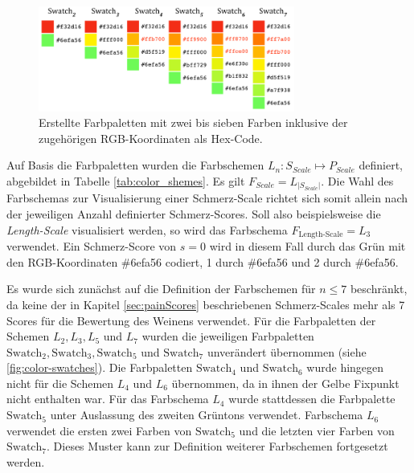 \begin{figure}[h]
	\centering
	\includegraphics[width=0.75\textwidth]{bilder/colorpics.png}
	\caption[Erstellte Farbpaletten mit zwei bis sieben Farben ]{Erstellte Farbpaletten mit zwei bis sieben Farben inklusive der zugehörigen RGB-Koordinaten als Hex-Code.}
	\label{fig:color-swatches}
\end{figure}

Auf Basis die Farbpaletten wurden die Farbschemen $L_{n}: S_{Scale} \mapsto P_{Scale}$ definiert, abgebildet in Tabelle \ref{tab:color_shemes}. Es gilt $F_{Scale} = L_{|S_{Scale}|}$. Die Wahl des Farbschemas zur Visualisierung einer Schmerz-Scale richtet sich somit allein nach der jeweiligen Anzahl definierter Schmerz-Scores. Soll also beispielsweise die \emph{Length-Scale} visualisiert werden, so wird das Farbschema $F_{\text{Length-Scale}} = L_3$ verwendet. Ein Schmerz-Score von $s = 0$ wird in diesem Fall durch das Grün mit den RGB-Koordinaten \#6efa56 codiert, 1 durch \#6efa56 und 2 durch \#6efa56.

Es wurde sich zunächst auf die Definition der Farbschemen für $n \leq 7$ beschränkt, da keine der in Kapitel \ref{sec:painScores} beschriebenen Schmerz-Scales mehr als 7 Scores für die Bewertung des Weinens verwendet. Für die Farbpaletten der Schemen $L_2, L_3, L_5$ und $L_7$ wurden die jeweiligen Farbpaletten $\text{Swatch}_2, \text{Swatch}_3,\text{Swatch}_5$ und $\text{Swatch}_7$ unverändert übernommen (siehe \autoref{fig:color-swatches}). Die Farbpaletten $\text{Swatch}_4$ und $\text{Swatch}_6$ wurde hingegen nicht für die Schemen $L_4$ und $L_6$ übernommen, da in ihnen der Gelbe Fixpunkt nicht enthalten war. Für das Farbschema $L_4$ wurde stattdessen die Farbpalette $\text{Swatch}_5$ unter Auslassung des zweiten Grüntons verwendet. Farbschema $L_6$ verwendet die ersten zwei Farben von $\text{Swatch}_5$ und die letzten vier Farben von $\text{Swatch}_7$. Dieses Muster kann zur Definition weiterer Farbschemen fortgesetzt werden.

